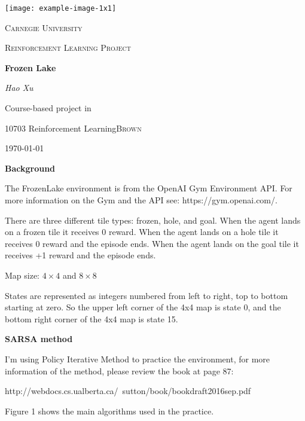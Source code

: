 \documentclass[12pt,a4paper]{report}
\begin{document}
\begin{titlepage}
	\centering
	\texttt{[image: example-image-1x1]}\par\vspace{1cm}
	{\scshape\LARGE Carnegie University \par}
	\vspace{1cm}
	{\scshape\Large Reinforcement Learning Project\par}
	\vspace{1.5cm}
	{\huge\bfseries Frozen Lake\par}
	\vspace{2cm}
	{\Large\itshape Hao Xu\par}
	\vfill
	Course-based project in\par
	10703 Reinforcement Learning\textsc{Brown}

	\vfill

	{\large \today\par}
\end{titlepage}


{\bfseries\Large Background}
\vspace{0.5cm}

The FrozenLake environment is from the OpenAI Gym Environment API. For more information on the Gym and the API see: https://gym.openai.com/. 

There are three different tile types: frozen, hole, and goal. When the agent lands on a frozen tile it receives 0 reward. When the agent lands on a hole tile it receives 0 reward and the episode ends. When the agent lands on the goal tile it receives +1 reward and the episode ends. 

Map size: $4\times4$ and $ 8\times8$

States are represented as integers numbered from left to right, top to bottom starting at zero. So the upper left corner of the 4x4 map is state 0, and the bottom right corner of the 4x4 map is state 15.


\vspace{0.5cm}
{\bfseries\Large SARSA method}
\vspace{0.5cm}

I'm using Policy Iterative Method to practice the environment, for more information of the method, please review the book at page 87:

http://webdocs.cs.ualberta.ca/~sutton/book/bookdraft2016sep.pdf

Figure 1 shows the main algorithms used in the practice.
\end{document}
